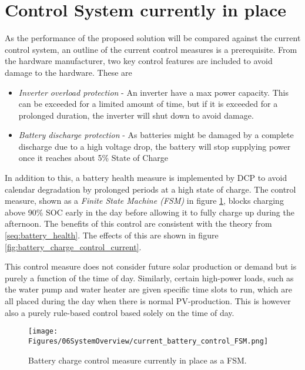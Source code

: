 \section{Control System currently in place}\label{seq:current_syst}
As the performance of the proposed solution will be compared against the current control system, an outline of the current control measures is a prerequisite. From the hardware manufacturer, two key control features are included to avoid damage to the hardware. These are
\begin{itemize}
    \item \textit{Inverter overload protection} -   An inverter have a max power capacity. This can be exceeded for a limited amount of time, but if it is exceeded for a prolonged duration, the inverter will shut down to avoid damage. 
    \item \textit{Battery discharge protection} -   As batteries might be damaged by a complete discharge due to a high voltage drop, the battery will stop supplying power once it reaches about 5\% State of Charge
\end{itemize}

In addition to this, a battery health measure is implemented by DCP to avoid calendar degradation by prolonged periods at a high state of charge. The control measure, shown as a \textit{Finite State Machine (FSM)} in figure \ref{fig:current_battery_control_FSM}, blocks charging above 90\% SOC early in the day before allowing it to fully charge up during the afternoon. The benefits of this control are consistent with the theory from \ref{seq:battery_health}. The effects of this are shown in figure \ref{fig:battery_charge_control_current}. 

This control measure does not consider future solar production or demand but is purely a function of the time of day. Similarly, certain high-power loads, such as the water pump and water heater are given specific time slots to run, which are all placed during the day when there is normal PV-production. This is however also a purely rule-based control based solely on the time of day.

\begin{figure}[h]
    \centering
    \texttt{[image: Figures/06SystemOverview/current\_battery\_control\_FSM.png]}
    \caption[Current Battery charge control system FSM]{Battery charge control measure currently in place as a FSM.}
    \label{fig:current_battery_control_FSM}
\end{figure}

